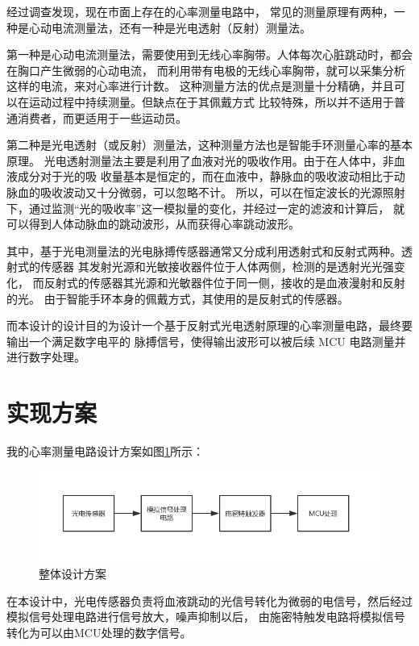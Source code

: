 \documentclass{article}
\begin{document}
\begin{spacing}{1.5}
   经过调查发现，现在市面上存在的心率测量电路中，
   常见的测量原理有两种，一种是心动电流测量法，还有一种是光电透射（反射）测量法。

   第一种是心动电流测量法，需要使用到无线心率胸带。人体每次心脏跳动时，都会在胸口产生微弱的心动电流，
   而利用带有电极的无线心率胸带，就可以采集分析这样的电流，来对心率进行计数。
   这种测量方法的优点是测量十分精确，并且可以在运动过程中持续测量。但缺点在于其佩戴方式
   比较特殊，所以并不适用于普通消费者，而更适用于一些运动员。

   第二种是光电透射（或反射）测量法，这种测量方法也是智能手环测量心率的基本原理。
   光电透射测量法主要是利用了血液对光的吸收作用。由于在人体中，非血液成分对于光的吸
   收量基本是恒定的，而在血液中，静脉血的吸收波动相比于动脉血的吸收波动又十分微弱，可以忽略不计。
   所以，可以在恒定波长的光源照射下，通过监测“光的吸收率”这一模拟量的变化，并经过一定的滤波和计算后，
   就可以得到人体动脉血的跳动波形，从而获得心率跳动波形。

    其中，基于光电测量法的光电脉搏传感器通常又分成利用透射式和反射式两种。透射式的传感器
    其发射光源和光敏接收器件位于人体两侧，检测的是透射光光强变化，
    而反射式的传感器其光源和光敏器件位于同一侧，接收的是血液漫射和反射的光。
    由于智能手环本身的佩戴方式，其使用的是反射式的传感器。

   而本设计的设计目的为设计一个基于反射式光电透射原理的心率测量电路，最终要输出一个满足数字电平的
   脉搏信号，使得输出波形可以被后续 MCU 电路测量并进行数字处理。

\section{实现方案}

    我的心率测量电路设计方案如图\ref{fig:design_flow}所示：
    \begin{figure}[H]
        \centering
        \includegraphics[scale=0.4]{fig/design/flow.png}
        \caption{整体设计方案}
        \label{fig:design_flow}
    \end{figure}
    
    在本设计中，光电传感器负责将血液跳动的光信号转化为微弱的电信号，然后经过模拟信号处理电路进行信号放大，噪声抑制以后，
    由施密特触发电路将模拟信号转化为可以由MCU处理的数字信号。


\end{spacing}
\end{document}

